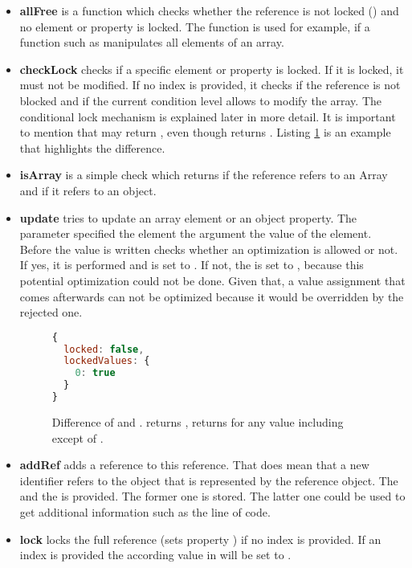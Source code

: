 \begin{itemize}

\item{\textbf{allFree}} is a function which checks whether the reference is not locked () and no element or property is locked. The function is used for example, if a function such as  manipulates all elements of an array.

\item{\textbf{checkLock}} checks if a specific element or property is locked. If it is locked, it must not be modified. If no index is provided, it checks if the reference is not blocked and if the current condition level allows to modify the array. The conditional lock mechanism is explained later in more detail. It is important to mention that  may return , even though  returns . Listing \ref{fig:allfree_checklock} is an example that highlights the difference.

\item{\textbf{isArray}} is a simple check which returns  if the reference refers to an Array and  if it refers to an object.

\item{\textbf{update}} tries to update an array element or an object property. The  parameter specified the element the  argument the value of the element. Before the value is written  checks whether an optimization is allowed or not. If yes, it is performed and  is set to . If not, the  is set to , because this potential optimization could not be done. Given that, a value assignment that comes afterwards can not be optimized because it would be overridden by the rejected one.

\begin{figure}[htbp]
\begin{lstlisting}[language=Javascript]
{
  locked: false,
  lockedValues: {
    0: true
  }
}
\end{lstlisting}
\caption{Difference of  and .  returns ,  returns  for any value including  except of .}\label{fig:allfree_checklock}
\end{figure}

\item{\textbf{addRef}} adds a reference to this reference. That does mean that a new identifier refers to the object that is represented by the reference object. The  and the  is provided. The former one is stored. The latter one could be used to get additional information such as the line of code.

\item{\textbf{lock}} locks the full reference (sets property ) if no index is provided. If an index is provided the according value in  will be set to .
\end{itemize}


